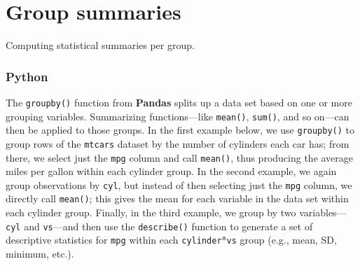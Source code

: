 \documentclass[
]{book}
\newenvironment{Shaded}{\begin{snugshade}}{\end{snugshade}}
\newcommand{\AttributeTok}[1]{\textcolor[rgb]{0.77,0.63,0.00}{#1}}
\newcommand{\DecValTok}[1]{\textcolor[rgb]{0.00,0.00,0.81}{#1}}
\newcommand{\FunctionTok}[1]{\textcolor[rgb]{0.00,0.00,0.00}{#1}}
\newcommand{\NormalTok}[1]{#1}
\newcommand{\SpecialCharTok}[1]{\textcolor[rgb]{0.00,0.00,0.00}{#1}}
\begin{document}
\begin{Shaded}
\end{Shaded}

\hypertarget{group-summaries}{%
\section{Group summaries}\label{group-summaries}}

Computing statistical summaries per group.

\hypertarget{python-39}{%
\subsubsection*{Python}\label{python-39}}

The \texttt{groupby()} function from \textbf{Pandas} splits up a data set based on one or more grouping variables. Summarizing functions---like \texttt{mean()}, \texttt{sum()}, and so on---can then be applied to those groups. In the first example below, we use \texttt{groupby()} to group rows of the \texttt{mtcars} dataset by the number of cylinders each car has; from there, we select just the \texttt{mpg} column and call \texttt{mean()}, thus producing the average miles per gallon within each cylinder group. In the second example, we again group observations by \texttt{cyl}, but instead of then selecting just the \texttt{mpg} column, we directly call \texttt{mean()}; this gives the mean for each variable in the data set within each cylinder group. Finally, in the third example, we group by two variables---\texttt{cyl} and \texttt{vs}---and then use the \texttt{describe()} function to generate a set of descriptive statistics for \texttt{mpg} within each \texttt{cylinder}*\texttt{vs} group (e.g., mean, SD, minimum, etc.).
\end{document}
